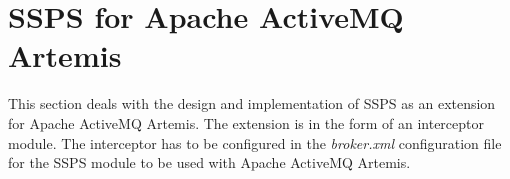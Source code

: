 \section{SSPS for Apache ActiveMQ Artemis}

This section deals with the design and implementation of SSPS as an extension for Apache ActiveMQ Artemis. The extension is in the form of an interceptor module. The interceptor has to be configured in the \textit{broker.xml} configuration file for the SSPS module to be used with Apache ActiveMQ Artemis.





